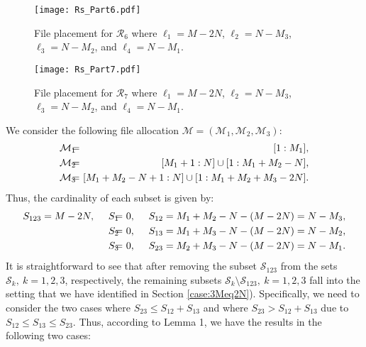 \documentclass[conference]{IEEEtran}
\begin{document}
\begin{figure}[!t] \centering %
\texttt{[image: Rs\_Part6.pdf]}\vspace{-0.2in}
\caption{File placement for ${\mathcal R}_6$ where ${\ell}_1=M-2N$, ${\ell}_2=N-M_3$, ${\ell}_3=N-M_2$, and ${\ell}_4=N-M_1$.}\label{caseR6}\vspace{-0.1in}
\end{figure}

\begin{figure}[!t] \centering %
\texttt{[image: Rs\_Part7.pdf]}\vspace{-0.2in}
\caption{File placement for ${\mathcal R}_7$ where ${\ell}_1=M-2N$, ${\ell}_2=N-M_3$, ${\ell}_3=N-M_2$, and ${\ell}_4=N-M_1$.}\label{caseR7}\vspace{-0.1in}
\end{figure}

We consider the following file allocation $\mathcal{M}=(\mathcal{M}_1,\mathcal{M}_2,\mathcal{M}_3)$:
\begin{eqnarray}
\mathcal{M}_1&\!\!\!\!=\!\!\!\!&[1:M_1],\notag\\
\mathcal{M}_2&\!\!\!\!=\!\!\!\!&[M_1+1:N]\cup [1:M_1+M_2-N],\\
\mathcal{M}_3&\!\!\!\!=\!\!\!\!&[M_1+M_2-N+1:N]\cup [1:M_1+M_2+M_3-2N].\notag
\end{eqnarray}
Thus, the cardinality of each subset is given by:
\begin{eqnarray}
S_{123} = M-2N,~~~~S_1&\!\!\!\!=\!\!\!\!&0,~~~~S_{12} = M_1+M_2-N-(M-2N)=N-M_3,\notag\\
S_2&\!\!\!\!=\!\!\!\!&0,~~~~S_{13} = M_1+M_3-N-(M-2N)=N-M_2,\notag\\
S_3&\!\!\!\!=\!\!\!\!&0,~~~~S_{23} = M_2+M_3-N-(M-2N)=N-M_1.
\end{eqnarray}
It is straightforward to see that after removing the subset $\mathcal{S}_{123}$ from the sets $\mathcal{S}_{k},~k=1,2,3$, respectively, the remaining subsets $\mathcal{S}_{k}\setminus \mathcal{S}_{123},~k=1,2,3$ fall into the setting that we have identified in Section \ref{case:3Meq2N}). Specifically, we need to consider the two cases where $S_{23}\leq S_{12}+S_{13}$ and where $S_{23}> S_{12}+S_{13}$ due to $S_{12}\leq S_{13} \leq S_{23}$. Thus, according to Lemma 1, we have the results in the following two cases:
\end{document}
